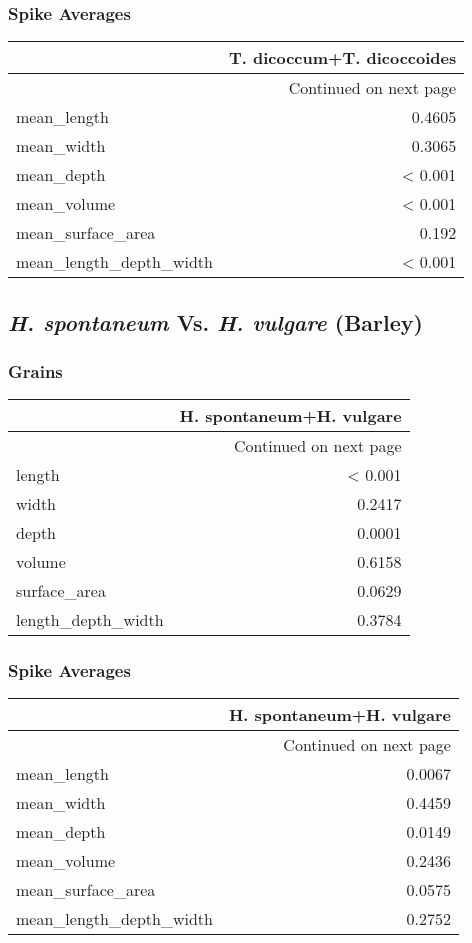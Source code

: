 \documentclass[a4paper]{article}
\begin{document}
\subsubsection*{Spike Averages}
\label{sec-3-2-2}
\begin{longtable}{p{5cm}|r}
 & T. dicoccum+T. dicoccoides\\
\hline
\endhead
\hline\multicolumn{2}{r}{Continued on next page} \\
\endfoot
\endlastfoot
mean\_length & 0.4605\\
mean\_width & 0.3065\\
mean\_depth & < 0.001\\
mean\_volume & < 0.001\\
mean\_surface\_area & 0.192\\
mean\_length\_depth\_width & < 0.001\\
\end{longtable}



\clearpage
\subsection*{\emph{H. spontaneum} Vs. \emph{H. vulgare} (Barley)}
\label{sec-3-3}

\subsubsection*{Grains}
\label{sec-3-3-1}

\begin{longtable}{p{5cm}|r}
 & H. spontaneum+H. vulgare\\
\hline
\endhead
\hline\multicolumn{2}{r}{Continued on next page} \\
\endfoot
\endlastfoot
length & < 0.001\\
width & 0.2417\\
depth & 0.0001\\
volume & 0.6158\\
surface\_area & 0.0629\\
length\_depth\_width & 0.3784\\
\end{longtable}



\subsubsection*{Spike Averages}
\label{sec-3-3-2}
\begin{longtable}{p{5cm}|r}
 & H. spontaneum+H. vulgare\\
\hline
\endhead
\hline\multicolumn{2}{r}{Continued on next page} \\
\endfoot
\endlastfoot
mean\_length & 0.0067\\
mean\_width & 0.4459\\
mean\_depth & 0.0149\\
mean\_volume & 0.2436\\
mean\_surface\_area & 0.0575\\
mean\_length\_depth\_width & 0.2752\\
\end{longtable}
\end{document}
